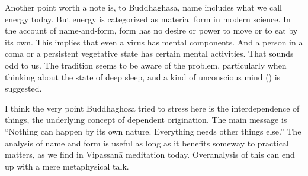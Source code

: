Another point worth a note is, to Buddhaghasa, name includes what we call energy today. But energy is categorized as material form in modern science. In the account of name-and-form, form has no desire or power to move or to eat by its own. This implies that even a virus has mental components. And a person in a coma or a persistent vegetative state has certain mental activities. That sounds odd to us. The tradition seems to be aware of the problem, particularly when thinking about the state of deep sleep, and a kind of unconscious mind () is suggested.

I think the very point Buddhaghosa tried to stress here is the interdependence of things, the underlying concept of dependent origination. The main message is ``Nothing can happen by its own nature. Everything needs other things else.'' The analysis of name and form is useful as long as it benefits someway to practical matters, as we find in Vipassan\=a meditation today. Overanalysis of this can end up with a mere metaphysical talk.
